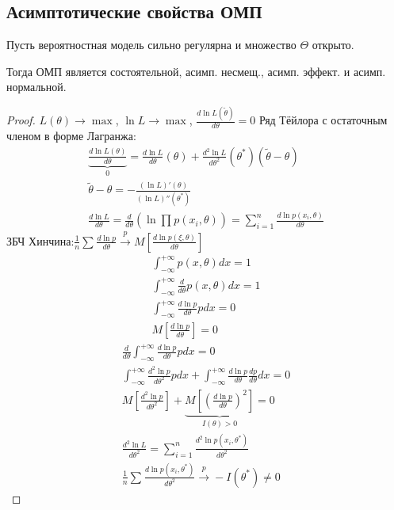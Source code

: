 \documentclass{article}
\begin{document}
\subsection{Асимптотические свойства ОМП}
\begin{theorem}
  Пусть вероятностная модель сильно регулярна и множество $\Theta$ открыто.

  Тогда ОМП является состоятельной, асимп. несмещ., асимп. эффект. и асимп. нормальной.
\end{theorem}
\begin{proof}
  $L(\theta)\to\max$, $\ln L\to\max$, $\frac{d\ln L(\tilde{\theta})}{d\theta}=0$
  Ряд Тёйлора с остаточным членом в форме Лагранжа:
  \begin{gather*}
    \underbrace{\frac{d\ln L(\theta)}{d\theta}}_{0}=\frac{d \ln L}{d\theta}(\theta)+\frac{d^{2} \ln L}{d\theta^{2}}(\theta^{*})(\tilde{\theta}-\theta) \\ 
    \tilde{\theta}-\theta=-\frac{(\ln L)'(\theta)}{(\ln L)''(\theta^{*})} \\ 
    \frac{d \ln L}{d \theta}=\frac{d}{d\theta}(\ln \prod_{}^{}p(x_i,\theta))=\sum_{i=1}^{n}\frac{d \ln p(x_i,\theta)}{d\theta}
  \end{gather*}
  ЗБЧ Хинчина:$\frac{1}{n}\sum_{}^{}\frac{d\ln p}{d\theta}\overset{p}{\to}M\left[\frac{d \ln p(\xi, \theta)}{d\theta}\right]$
  \begin{gather*}
    \int_{-\infty}^{+\infty}p(x,\theta)dx=1 \\ 
    \int_{-\infty}^{+\infty}\frac{d}{d\theta}p(x,\theta)dx=1 \\ 
    \int_{-\infty}^{+\infty}\frac{d \ln p}{d\theta}p dx =0 \\ 
    M\left[\frac{d \ln p}{d\theta}\right]=0
  \end{gather*}
  \begin{gather*}
    \frac{d}{d\theta}\int_{-\infty}^{+\infty}\frac{d \ln p}{d\theta}p dx =0 \\ 
    \int_{-\infty}^{+\infty}\frac{d^{2}\ln p}{d\theta^{2}}p dx + \int_{-\infty}^{+\infty}\frac{d \ln p}{d\theta}\frac{dp}{d\theta}dx=0 \\ 
    M\left[\frac{d^{2} \ln p}{d\theta^{2}}\right] + \underbrace{M\left[\left(\frac{d \ln p}{d\theta}\right)^{2}\right]}_{I(\theta)>0} = 0 \\ 
    \frac{d^{2} \ln L}{d\theta^{2}}=\sum_{i=1}^{n}\frac{d^{2}\ln p(x_i,\theta^{*})}{d\theta^{2}} \\ 
    \frac{1}{n}\sum_{}^{}\frac{d\ln p(x_i,\theta^{*})}{d\theta^{2}} \overset{p}{\to}-I(\theta^{*}) \neq 0

\end{gather*}
\end{proof}
\end{document}
